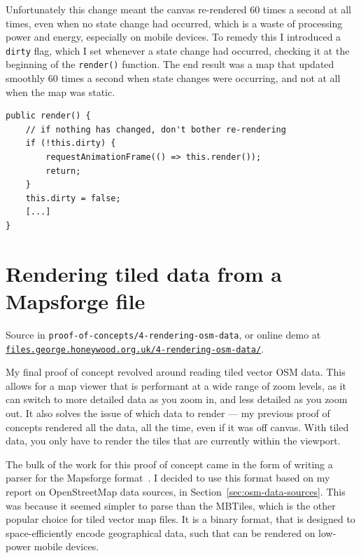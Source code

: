 \documentclass{final_report}
\begin{document}
Unfortunately this change meant the canvas re-rendered 60 times a second at all times, even when no state change had occurred, which is a waste of processing power and energy, especially on mobile devices. To remedy this I introduced a \texttt{dirty} flag, which I set whenever a state change had occurred, checking it at the beginning of the \texttt{render()} function. The end result was a map that updated smoothly 60 times a second when state changes were occurring, and not at all when the map was static.

\begin{lstlisting}[caption=Only rendering when the map state is \texttt{dirty}]
public render() {
    // if nothing has changed, don't bother re-rendering
    if (!this.dirty) {
        requestAnimationFrame(() => this.render());
        return;
    }
    this.dirty = false;
    [...]
}
\end{lstlisting}

\section{Rendering tiled data from a Mapsforge file}

{ \footnotesize Source in \texttt{proof-of-concepts/4-rendering-osm-data}, or online demo at \href{https://files.george.honeywood.org.uk/4-rendering-osm-data/#15/50.7895/-1.8938}{\nolinkurl{files.george.honeywood.org.uk/4-rendering-osm-data/}}.}

My final proof of concept revolved around reading tiled vector OSM data. This allows for a map viewer that is performant at a wide range of zoom levels, as it can switch to more detailed data as you zoom in, and less detailed as you zoom out. It also solves the issue of which data to render --- my previous proof of concepts rendered all the data, all the time, even if it was off canvas. With tiled data, you only have to render the tiles that are currently within the viewport.

The bulk of the work for this proof of concept came in the form of writing a parser for the Mapsforge format~\cite{mapsforge-format}. I decided to use this format based on my report on OpenStreetMap data sources, in Section~\ref{sec:osm-data-sources}. This was because it seemed simpler to parse than the MBTiles, which is the other popular choice for tiled vector map files. It is a binary format, that is designed to space-efficiently encode geographical data, such that can be rendered on low-power mobile devices.
\end{document}

